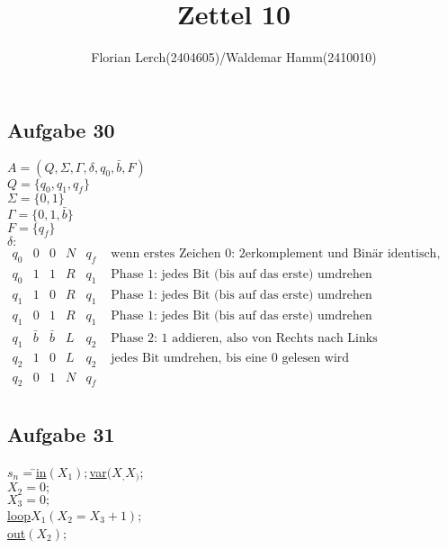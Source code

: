 \documentclass[11pt]{amsart}
\title{Zettel 10}
\author{Florian Lerch(2404605)/Waldemar Hamm(2410010)}
\begin{document}
\maketitle

\subsection*{Aufgabe 30}

$A = (Q, \Sigma, \Gamma, \delta, q_0, \bar{b}, F)$ \\
$Q = \{q_0, q_1, q_f \}$ \\
$\Sigma = \{0, 1\}$ \\
$\Gamma = \{0, 1, \bar{b} \}$ \\
$F = \{q_f\}$ \\
$\delta:$ \\
$\begin{array}{cccccc}
q_0 & 0 & 0 & N & q_f & \mbox{ wenn erstes Zeichen 0: 2erkomplement und Binär identisch, also fertig } \\
q_0 & 1 & 1 & R & q_1 & \mbox{ Phase 1: jedes Bit (bis auf das erste) umdrehen } \\
q_1 & 1 & 0 & R & q_1 & \mbox{ Phase 1: jedes Bit (bis auf das erste) umdrehen } \\
q_1 & 0 & 1 & R & q_1 & \mbox{ Phase 1: jedes Bit (bis auf das erste) umdrehen } \\
q_1 & \bar{b} & \bar{b} & L & q_2 & \mbox{ Phase 2: 1 addieren, also von Rechts nach Links } \\
q_2 & 1 & 0 & L & q_2 & \mbox{ jedes Bit umdrehen, bis eine 0 gelesen wird } \\
q_2 & 0 & 1 & N & q_f & \\ 
\end{array}$

\subsection*{Aufgabe 31}

\begin{tabbing}
  $s_n = $\=$ $\underline{in}$ (X_1); $\underline{var}$(X_,X_);$ \\
  \>$ X_2 = 0;$ \\
  \>$ X_3 = 0;$ \\
  \>$ $\underline{loop}$ X_1(X_2 = X_3 + 1);$ \\
  \>$ $\underline{out}$ (X_2);$
\end{tabbing}
  
  \vspace{0.5cm}
  
\end{document}

